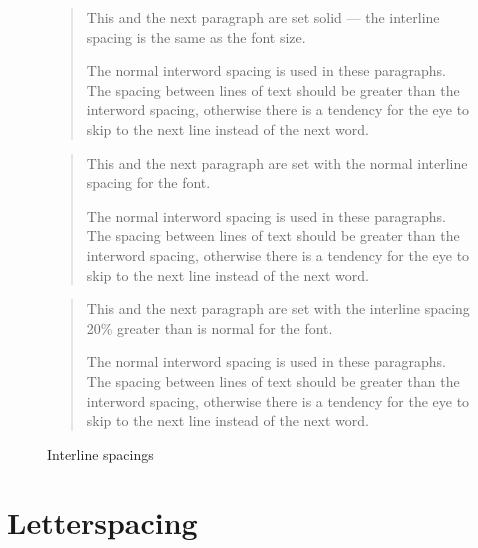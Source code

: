 \documentclass[10pt,a4paper,oneside,extrafontsizes]{memoir}%
\newcommand{\PWnote}[2]{}
\begin{document}
\begin{figure}
\centering
\begin{minipage}{\textwidth}
\mbox{}\hrulefill\mbox{}
\normalfont\setlength{\unitlength}{\baselineskip}
\begin{quotation}
\normalfont\setlength{\baselineskip}{1em}
    This and the next paragraph are set solid --- the interline spacing 
is the same as the font size. \par
The normal interword spacing is used in these paragraphs.
    The spacing between lines of text should be greater than the interword
spacing, otherwise there is a tendency for the eye to skip to the
next line instead of the next word. \par
\end{quotation}
\begin{quotation}
\normalfont\setlength{\baselineskip}{\unitlength}
    This and the next paragraph are set with the normal interline spacing 
for the font. \par
The normal interword spacing is used in these paragraphs.
    The spacing between lines of text should be greater than the interword
spacing, otherwise there is a tendency for the eye to skip to the
next line instead of the next word. \par
\end{quotation}
\begin{quotation}
\normalfont\setlength{\parskip}{0.2\baselineskip}\setlength{\baselineskip}{1.2\unitlength}
    This and the next paragraph are set with the interline spacing 20\% 
greater than is normal for the font. \par
The normal interword spacing is used in these paragraphs.
    The spacing between lines of text should be greater than the interword
spacing, otherwise there is a tendency for the eye to skip to the
next line instead of the next word. \par
\end{quotation}
\mbox{}\hrulefill\mbox{}
\end{minipage}
\normalfont\setlength{\baselineskip}{\unitlength}
\setlength{\unitlength}{1pt}
\caption{Interline spacings}\label{fig:interline}
\end{figure}
\setlength{\unitlength}{1pt}

\PWnote{2009/03/31}{Added section on letterspacing}
\section{Letterspacing}
\end{document}
